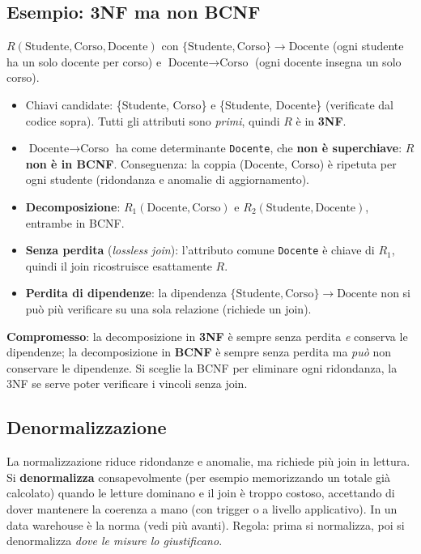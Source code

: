 \subsection{Esempio: 3NF ma non BCNF}
$R(\text{Studente}, \text{Corso}, \text{Docente})$ con $\{\text{Studente},\text{Corso}\}\to\text{Docente}$ (ogni studente ha un solo docente per corso) e $\text{Docente}\to\text{Corso}$ (ogni docente insegna un solo corso).
\begin{itemize}
    \item Chiavi candidate: \{Studente, Corso\} e \{Studente, Docente\} (verificate dal codice sopra). Tutti gli attributi sono \emph{primi}, quindi $R$ è in \textbf{3NF}.
    \item $\text{Docente}\to\text{Corso}$ ha come determinante \texttt{Docente}, che \textbf{non è superchiave}: $R$ \textbf{non è in BCNF}. Conseguenza: la coppia (Docente, Corso) è ripetuta per ogni studente (ridondanza e anomalie di aggiornamento).
    \item \textbf{Decomposizione}: $R_1(\text{Docente},\text{Corso})$ e $R_2(\text{Studente},\text{Docente})$, entrambe in BCNF.
    \item \textbf{Senza perdita} (\emph{lossless join}): l'attributo comune \texttt{Docente} è chiave di $R_1$, quindi il join ricostruisce esattamente $R$.
    \item \textbf{Perdita di dipendenze}: la dipendenza $\{\text{Studente},\text{Corso}\}\to\text{Docente}$ non si può più verificare su una sola relazione (richiede un join).
\end{itemize}
\textbf{Compromesso}: la decomposizione in \textbf{3NF} è sempre senza perdita \emph{e} conserva le dipendenze; la decomposizione in \textbf{BCNF} è sempre senza perdita ma \emph{può} non conservare le dipendenze. Si sceglie la BCNF per eliminare ogni ridondanza, la 3NF se serve poter verificare i vincoli senza join.

\subsection{Denormalizzazione}
La normalizzazione riduce ridondanze e anomalie, ma richiede più join in lettura. Si \textbf{denormalizza} consapevolmente (per esempio memorizzando un totale già calcolato) quando le letture dominano e il join è troppo costoso, accettando di dover mantenere la coerenza a mano (con trigger o a livello applicativo). In un data warehouse è la norma (vedi più avanti). Regola: prima si normalizza, poi si denormalizza \emph{dove le misure lo giustificano}.

